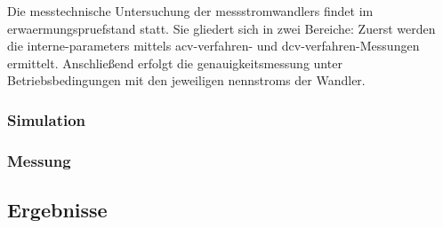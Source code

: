 Die messtechnische Untersuchung der \glspl{messstromwandler} findet im \gls{erwaermungspruefstand} statt. Sie gliedert sich in zwei Bereiche: Zuerst werden die \glspl{interne-parameter} mittels \gls{acv-verfahren}- und \gls{dcv-verfahren}-Messungen ermittelt. Anschließend erfolgt die \gls{genauigkeitsmessung} unter Betriebsbedingungen mit den jeweiligen \glspl{nennstrom} der Wandler.

\subsubsection{Simulation}
\label{sec:vorgehen:simulation}



\subsubsection{Messung}
\label{sec:vorgehen:messung}

\subsection{Ergebnisse}
\label{sec:ergebnisse}
